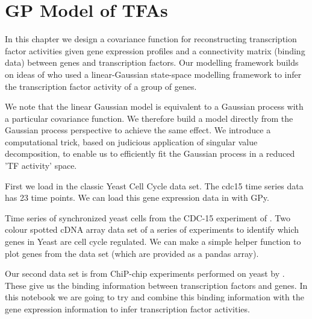 
\chapter{GP Model of TFAs}

\ifpdf
    \graphicspath{{Chapter4/Figs/Raster/}{Chapter4/Figs/PDF/}{Chapter4/Figs/}}
\else
    \graphicspath{{Chapter4/Figs/Vector/}{Chapter4/Figs/}}
\fi

In this chapter we design a covariance function for reconstructing transcription factor activities given gene 
expression profiles and a connectivity matrix (binding data) between genes and transcription factors. 
Our modelling framework builds on ideas of \cite{Sanguinetti:2006} 
who used a linear-Gaussian state-space modelling framework to infer the transcription factor activity 
of a group of genes. 

We note that the linear Gaussian model is equivalent to a Gaussian process with a particular covariance function. 
We therefore build a model directly from the Gaussian process perspective to achieve the same effect. 
We introduce a computational trick, based on  judicious application of singular value decomposition, 
to enable us to efficiently fit the Gaussian process in a reduced 'TF activity' space. 


First we load in the classic \cite{Spellman:1998} Yeast Cell Cycle data set. The cdc15 time series data has 
23 time points. We can load this gene expression data in with GPy.

Time series of synchronized yeast cells from the CDC-15 experiment of \cite{Spellman:1998}. 
Two colour spotted cDNA array data set of a series of experiments to identify which genes in Yeast are 
cell cycle regulated.
We can make a simple helper function to plot genes from the data set (which are provided as a pandas array).

Our second data set is from ChiP-chip experiments performed on yeast by \cite{Lee:2002}. 
These give us the binding information between transcription factors and genes. 
In this notebook we are going to try and combine this binding information with 
the gene expression information to infer transcription factor activities.

